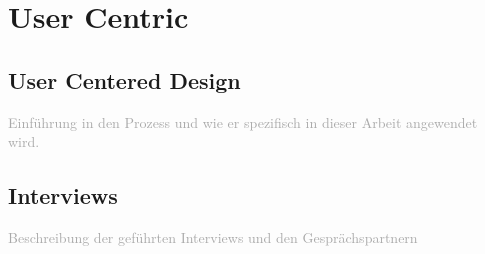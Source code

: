 \chapter{User Centric}
\label{sec:usercentric}

\section{User Centered Design}
\textcolor{darkgray}{
	Einführung in den Prozess und wie er spezifisch in dieser Arbeit angewendet wird.
}


\section{Interviews}
\textcolor{darkgray}{
	Beschreibung der geführten Interviews und den Gesprächspartnern
}